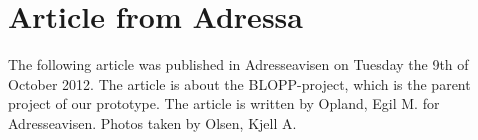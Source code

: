 \chapter{Article from Adressa}
\label{apx:ArticleAdressa}

The following article was published in Adresseavisen on Tuesday the 9th of October 2012. The article is about the BLOPP-project, which is the parent project of our prototype. The article is written by Opland, Egil M. for Adresseavisen. Photos taken by Olsen, Kjell A.

